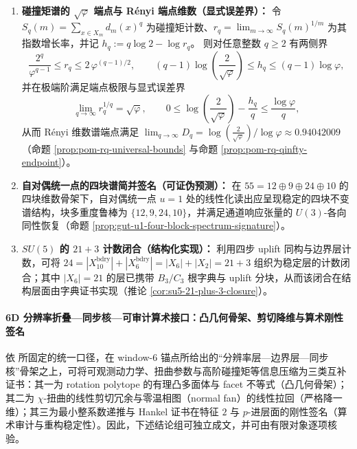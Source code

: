 \begin{theorem}
\begin{enumerate}
  \item \textbf{碰撞矩谱的 \texorpdfstring{$\sqrt{\varphi}$}{sqrt(phi)} 端点与 Rényi 端点维数（显式误差界）：}
  令 \(S_q(m)=\sum_{x\in X_m}d_m(x)^q\) 为碰撞矩计数、\(r_q=\lim_{m\to\infty}S_q(m)^{1/m}\) 为其指数增长率，并记 \(h_q:=q\log 2-\log r_q\)。
  则对任意整数 \(q\ge 2\) 有两侧界
  \[
  \frac{2^q}{\varphi^{q-1}}\le r_q\le 2\,\varphi^{(q-1)/2},
  \qquad
  (q-1)\log\!\left(\frac{2}{\sqrt{\varphi}}\right)\le h_q\le (q-1)\log\varphi,
  \]
  并在极端阶满足端点极限与显式误差界
  \[
  \lim_{q\to\infty} r_q^{1/q}=\sqrt{\varphi},\qquad
  0\le \log\!\left(\frac{2}{\sqrt{\varphi}}\right)-\frac{h_q}{q}\le \frac{\log\varphi}{q},
  \]
  从而 Rényi 维数谱端点满足
  \(
  \lim_{q\to\infty}D_q=\log\!\left(\frac{2}{\sqrt{\varphi}}\right)/\log\varphi\approx 0.94042009
  \)
  （命题 \ref{prop:pom-rq-universal-bounds} 与命题 \ref{prop:pom-rq-qinfty-endpoint}）。

  \item \textbf{自对偶统一点的四块谱简并签名（可证伪预测）：}
  在 \(55=12\oplus 9\oplus 24\oplus 10\) 的四块维数骨架下，自对偶统一点 \(u=1\) 处的线性化读出应呈现稳定的四块不变谱结构，块多重度鲁棒为 \(\{12,9,24,10\}\)，并满足通道响应张量的 \(U(3)\)-各向同性恢复（命题 \ref{prop:gut-u1-four-block-spectrum-signature}）。

  \item \textbf{\texorpdfstring{$SU(5)$}{SU(5)} 的 \(21+3\) 计数闭合（结构化实现）：}
  利用四步 uplift 同构与边界层计数，可将
  \(
  24=|X_{10}^{\mathrm{bdry}}|+|X_6^{\mathrm{bdry}}|
  =|X_6|+|X_2|=21+3
  \)
  组织为稳定层的计数闭合；其中 \(|X_6|=21\) 的层已携带 \(B_3/C_3\) 根字典与 uplift 分块，从而该闭合在结构层面由字典证书实现（推论 \ref{cor:su5-21-plus-3-closure}）。
\end{enumerate}
\end{theorem}

\paragraph{6D 分辨率折叠—同步核—可审计算术接口：凸几何骨架、剪切降维与算术刚性签名}
依 \cite{Internal2026POMGenerativeAddressThreeRegisterBridgeRH} 所固定的统一口径，在 window-\(6\) 锚点所给出的“分辨率层—边界层—同步核”骨架之上，可将可观测动力学、扭曲参数与高阶碰撞矩等信息压缩为三类互补证书：其一为 rotation polytope 的有理凸多面体与 facet 不等式（凸几何骨架）；其二为 \(\chi\)-扭曲的线性剪切冗余与零温相图（normal fan）的线性拉回（严格降一维）；其三为最小整系数递推与 Hankel 证书在特征 \(2\) 与 \(p\)-进层面的刚性签名（算术审计与重构稳定性）。因此，下述结论组可独立成文，并可由有限对象逐项核验。

